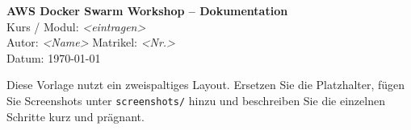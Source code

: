 \documentclass[11pt,a4paper,twocolumn]{article}
\begin{document}
\begingroup
\onecolumn
{}           %
\thispagestyle{empty}


\vspace*{3.5cm}
\hspace*{2.4cm}
\begin{minipage}[t]{0.75\textwidth}
  {\color{white}
    {\LARGE \textbf{AWS Docker Swarm Workshop – Dokumentation}}\\[8mm]
    {\large Kurs / Modul: \textit{<eintragen>}}\\[2mm]
    {\large Autor: \textit{<Name>} \quad Matrikel: \textit{<Nr.>}}\\[2mm]
    {\large Datum: \today}\\[12mm]

    \begin{tcolorbox}[colback=black!40!white,colframe=white,title=\color{white}Hinweis]
      Diese Vorlage nutzt ein zweispaltiges Layout. Ersetzen Sie die Platzhalter, fügen Sie
      Screenshots unter \texttt{screenshots/} hinzu und beschreiben Sie die einzelnen Schritte
      kurz und prägnant.
    \end{tcolorbox}
  }
\end{minipage}
\end{document}
